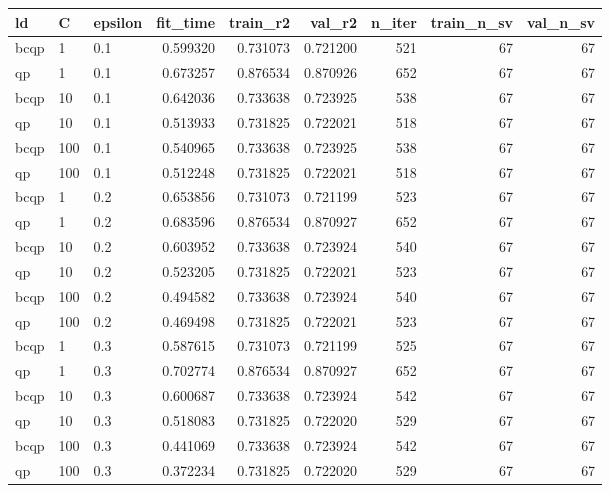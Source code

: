 \begin{tabular}{lllrrrrrr}
\toprule
  ld &   C & epsilon &  fit\_time &  train\_r2 &   val\_r2 &  n\_iter &  train\_n\_sv &  val\_n\_sv \\
\midrule
bcqp &   1 &     0.1 &  0.599320 &  0.731073 & 0.721200 &     521 &          67 &        67 \\
  qp &   1 &     0.1 &  0.673257 &  0.876534 & 0.870926 &     652 &          67 &        67 \\
bcqp &  10 &     0.1 &  0.642036 &  0.733638 & 0.723925 &     538 &          67 &        67 \\
  qp &  10 &     0.1 &  0.513933 &  0.731825 & 0.722021 &     518 &          67 &        67 \\
bcqp & 100 &     0.1 &  0.540965 &  0.733638 & 0.723925 &     538 &          67 &        67 \\
  qp & 100 &     0.1 &  0.512248 &  0.731825 & 0.722021 &     518 &          67 &        67 \\
bcqp &   1 &     0.2 &  0.653856 &  0.731073 & 0.721199 &     523 &          67 &        67 \\
  qp &   1 &     0.2 &  0.683596 &  0.876534 & 0.870927 &     652 &          67 &        67 \\
bcqp &  10 &     0.2 &  0.603952 &  0.733638 & 0.723924 &     540 &          67 &        67 \\
  qp &  10 &     0.2 &  0.523205 &  0.731825 & 0.722021 &     523 &          67 &        67 \\
bcqp & 100 &     0.2 &  0.494582 &  0.733638 & 0.723924 &     540 &          67 &        67 \\
  qp & 100 &     0.2 &  0.469498 &  0.731825 & 0.722021 &     523 &          67 &        67 \\
bcqp &   1 &     0.3 &  0.587615 &  0.731073 & 0.721199 &     525 &          67 &        67 \\
  qp &   1 &     0.3 &  0.702774 &  0.876534 & 0.870927 &     652 &          67 &        67 \\
bcqp &  10 &     0.3 &  0.600687 &  0.733638 & 0.723924 &     542 &          67 &        67 \\
  qp &  10 &     0.3 &  0.518083 &  0.731825 & 0.722020 &     529 &          67 &        67 \\
bcqp & 100 &     0.3 &  0.441069 &  0.733638 & 0.723924 &     542 &          67 &        67 \\
  qp & 100 &     0.3 &  0.372234 &  0.731825 & 0.722020 &     529 &          67 &        67 \\
\bottomrule
\end{tabular}
